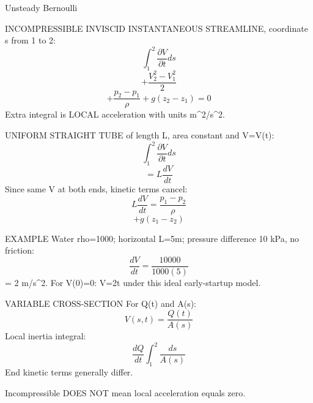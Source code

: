 Unsteady Bernoulli

INCOMPRESSIBLE INVISCID INSTANTANEOUS STREAMLINE, coordinate s from 1 to 2:
$$\int_1^2\frac{\partial V}{\partial t}ds$$
$$+\frac{V_2^2-V_1^2}{2}$$
$$+\frac{p_2-p_1}{\rho}+g(z_2-z_1)=0$$
Extra integral is LOCAL acceleration with units m^2/s^2.

UNIFORM STRAIGHT TUBE of length L, area constant and V=V(t):
$$\int_1^2\frac{\partial V}{\partial t}ds$$
$$=L\frac{dV}{dt}$$
Since same V at both ends, kinetic terms cancel:
$$L\frac{dV}{dt}=\frac{p_1-p_2}{\rho}$$
$$+g(z_1-z_2)$$

EXAMPLE
Water rho=1000; horizontal L=5m; pressure difference 10 kPa, no friction:
$$\frac{dV}{dt}=\frac{10000}{1000(5)}$$
= 2 m/s^2. For V(0)=0: V=2t under this ideal early-startup model.

VARIABLE CROSS-SECTION
For Q(t) and A(s):
$$V(s,t)=\frac{Q(t)}{A(s)}$$
Local inertia integral:
$$\frac{dQ}{dt}\int_1^2\frac{ds}{A(s)}$$
End kinetic terms generally differ.

Incompressible DOES NOT mean local acceleration equals zero.
